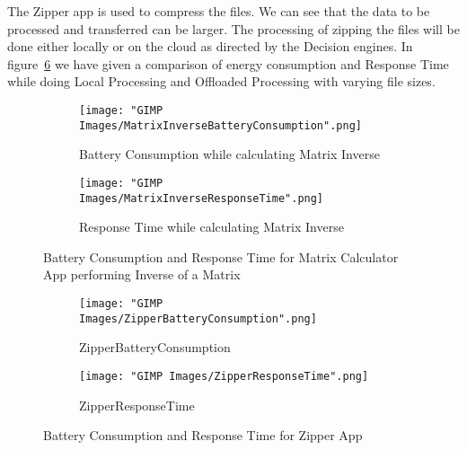 \documentclass[12pt]{report}
\begin{document}
The Zipper app is used to compress the files. We can see that the data to be processed and transferred can be larger. The processing of zipping the files will be done either locally or on the cloud as directed by the Decision engines. In figure~\ref{fig:ZipperBatteryAndResponseTime} we have given a comparison of energy consumption and Response Time while doing Local Processing and Offloaded Processing with varying file sizes.


\begin{figure}[h!]
  \centering
  \begin{subfigure}[b]{0.40\textwidth}
    \texttt{[image: "GIMP Images/MatrixInverseBatteryConsumption".png]}
    \caption{Battery Consumption while calculating Matrix Inverse}
    \label{fig:MatrixInverseBatteryConsumption}
  \end{subfigure}
\quad
  \begin{subfigure}[b]{0.40\textwidth}
    \texttt{[image: "GIMP Images/MatrixInverseResponseTime".png]}
    \caption{Response Time while calculating Matrix Inverse}
    \label{fig:MatrixInverseResponseTime}
  \end{subfigure}

  \caption{Battery Consumption and Response Time for Matrix Calculator App 
performing Inverse of a Matrix}\label{fig:MatrixInverseBatteryAndResponseTime}
\end{figure}

\begin{figure}[h!]
  \centering
  \begin{subfigure}[b]{0.45\textwidth}
    \texttt{[image: "GIMP Images/ZipperBatteryConsumption".png]}
    \caption{ZipperBatteryConsumption}
    \label{fig:ZipperBatteryConsumption}
  \end{subfigure}
\quad
  \begin{subfigure}[b]{0.45\textwidth}
    \texttt{[image: "GIMP Images/ZipperResponseTime".png]}
    \caption{ZipperResponseTime}
    \label{fig:ZipperResponseTime}
  \end{subfigure}

  \caption{Battery Consumption and Response Time for Zipper App}\label{fig:ZipperBatteryAndResponseTime}
\end{figure}
\end{document}
